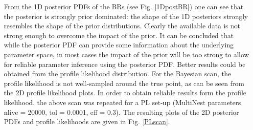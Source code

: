 \documentclass{article}
\begin{document}
From the 1D posterior PDFs of the BRs (see Fig. \ref{1DpostBR}) one can see that the posterior is strongly prior dominated: the shape of the 1D posteriors strongly resembles the shape of the prior distributions. Clearly the available data is not strong enough to overcome the impact of the prior. It can be concluded that while the posterior PDF can provide some information about the underlying parameter space, in most cases the impact of the prior will be too strong to allow for reliable parameter inference using the posterior PDF. Better results could be obtained from the profile likelihood distribution. For the Bayesian scan, the profile likelihood is not well-sampled around the true point, as can be seen from the 2D profile likelihood plots. In order to obtain reliable results form the profile likelihood, the above scan was repeated for a PL set-up (MultiNest parameters nlive = 20000, tol = 0.0001, eff = 0.3). The resulting plots of the 2D posterior PDFs and profile likelihoods are given in Fig. \ref{PLscan}. \\
\end{document}
